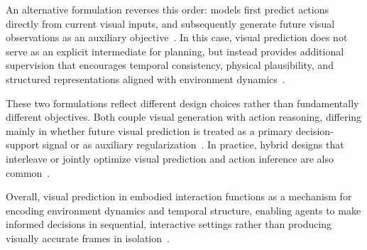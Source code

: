 An alternative formulation reverses this order: models first predict actions directly from current visual inputs, and subsequently generate future visual observations as an auxiliary objective~\citep{li2025uva,zhu2025uwm,liang2025videopolicy,shen2025videovla,hu2024vpp}. In this case, visual prediction does not serve as an explicit intermediate for planning, but instead provides additional supervision that encourages temporal consistency, physical plausibility, and structured representations aligned with environment dynamics~\citep{li2025uva,zhu2025uwm}.

These two formulations reflect different design choices rather than fundamentally different objectives. Both couple visual generation with action reasoning, differing mainly in whether future visual prediction is treated as a primary decision-support signal or as auxiliary regularization~\citep{tian2024predictive,li2025uva,zhu2025uwm}. In practice, hybrid designs that interleave or jointly optimize visual prediction and action inference are also common~\citep{li2025uva,zhu2025uwm,liang2025videopolicy,shen2025videovla}.

Overall, visual prediction in embodied interaction functions as a mechanism for encoding environment dynamics and temporal structure, enabling agents to make informed decisions in sequential, interactive settings rather than producing visually accurate frames in isolation~\citep{meietal2026videoroboticsurvey,hu2024vpp,li2025uva}.



